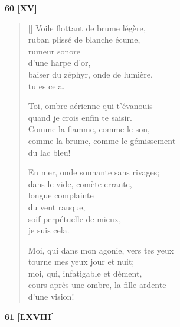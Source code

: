\documentclass[a4paper,12pt]{book}
\begin{document}
\bigskip

\begin{center}
  \textbf{60 [XV]}
\end{center}

\settowidth{\versewidth}{Moi, qui dans mon agonie, vers tes yeux}

\begin{verse}[\versewidth]
  Voile flottant de brume légère, \\
  ruban plissé de blanche écume, \\
  rumeur sonore \\
  d'une harpe d'or, \\
  baiser du zéphyr, onde de lumière, \\
  tu es cela.

  Toi, ombre aérienne qui t'évanouis \\
  quand je crois enfin te saisir. \\
  Comme la flamme, comme le son, \\
  comme la brume, comme le gémissement \\
  du lac bleu!

  En mer, onde sonnante sans rivages; \\
  dans le vide, comète errante, \\
  longue complainte \\
  du vent rauque, \\
  soif perpétuelle de mieux, \\
  je suis cela.

  Moi, qui dans mon agonie, vers tes yeux \\
  tourne mes yeux jour et nuit; \\
  moi, qui, infatigable et dément, \\
  cours après une ombre, la fille ardente \\
  d'une vision!
\end{verse}

\bigskip

\begin{center}
  \textbf{61 [LXVIII]}
\end{center}

\settowidth{\versewidth}{et, pour la première fois, je sentis en le notant}
\end{document}
